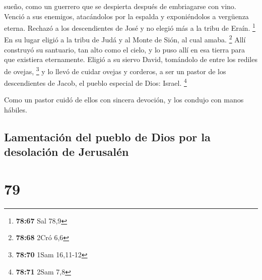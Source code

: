 sueño, como un guerrero que se despierta después de embriagarse con
vino.  Venció a sus enemigos, atacándolos por la espalda y
exponiéndolos a vergüenza eterna.  Rechazó a los
descendientes de José y no elegió más a la tribu de Eraín. \footnote{\textbf{78:67}
  Sal 78,9}  En su lugar eligió a la tribu de Judá y al
Monte de Sión, al cual amaba. \footnote{\textbf{78:68} 2Cró 6,6}
 Allí construyó su santuario, tan alto como el cielo, y lo
puso allí en esa tierra para que existiera eternamente. 
Eligió a su siervo David, tomándolo de entre los rediles de ovejas,
\footnote{\textbf{78:70} 1Sam 16,11-12}  y lo llevó de
cuidar ovejas y corderos, a ser un pastor de los descendientes de Jacob,
el pueblo especial de Dios: Israel. \footnote{\textbf{78:71} 2Sam 7,8}

 Como un pastor cuidó de ellos con sincera devoción, y los
condujo con manos hábiles.

\hypertarget{lamentaciuxf3n-del-pueblo-de-dios-por-la-desolaciuxf3n-de-jerusaluxe9n}{%
\subsection{Lamentación del pueblo de Dios por la desolación de
Jerusalén}\label{lamentaciuxf3n-del-pueblo-de-dios-por-la-desolaciuxf3n-de-jerusaluxe9n}}

\hypertarget{section-78}{%
\section{79}\label{section-78}}

